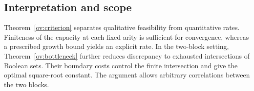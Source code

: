 \subsection{Interpretation and scope}
Theorem~\ref{ov:criterion} separates qualitative feasibility from quantitative rates. Finiteness of the capacity at each fixed arity is sufficient for convergence, whereas a prescribed growth bound yields an explicit rate. In the two-block setting, Theorem~\ref{ov:bottleneck} further reduces discrepancy to exhausted intersections of Boolean sets. Their boundary costs control the finite intersection and give the optimal square-root constant. The argument allows arbitrary correlations between the two blocks.
